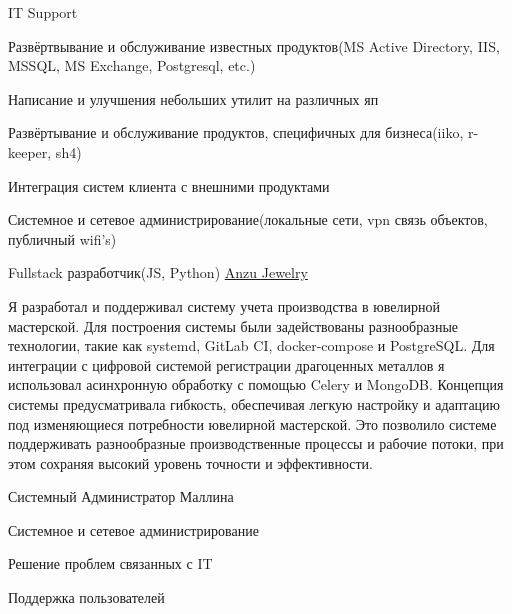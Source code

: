 \begin{cventries}
  \cventry
    {IT Support} %
    {} %
    {} %
    {} %
    {
      \begin{cvitems} %
        \item {Развёртвывание и обслуживание известных продуктов(MS Active Directory, IIS, MSSQL, MS Exchange, Postgresql, etc.)}
        \item {Написание и улучшения небольших утилит на различных яп}
        \item {Развёртывание и обслуживание продуктов, специфичных для бизнеса(iiko, r-keeper, sh4)}
        \item {Интеграция систем клиента с внешними продуктами}
        \item {Системное и сетевое администрирование(локальные сети, vpn связь объектов, публичный wifi's)}
      \end{cvitems}
    }
  \cventry
    {Fullstack разработчик(JS, Python)}
    {\href{https://anzujewelry.com/}{Anzu Jewelry}}
    {} %
    {} %
    {
      \begin{cvitems}
        Я разработал и поддерживал систему учета производства в ювелирной мастерской.
        Для построения системы были задействованы разнообразные технологии,
        такие как systemd, GitLab CI, docker-compose и PostgreSQL.
        Для интеграции с цифровой системой регистрации драгоценных металлов
        я использовал асинхронную обработку с помощью Celery и MongoDB.
        Концепция системы предусматривала гибкость, обеспечивая легкую настройку и
        адаптацию под изменяющиеся потребности ювелирной мастерской.
        Это позволило системе поддерживать разнообразные производственные процессы и рабочие потоки,
        при этом сохраняя высокий уровень точности и эффективности.
      \end{cvitems}
    }
  \cventry
    {Системный Администратор} %
    {Маллина} %
    {} %
    {} %
    {
      \begin{cvitems} %
        \item {Системное и сетевое администрирование}
        \item {Решение проблем связанных с IT}
        \item {Поддержка пользователей}
      \end{cvitems}
    }

\end{cventries}
